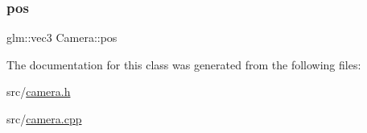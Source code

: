\mbox{\label{classCamera_ae54915cea5c8741a9cc38b8f9b6849ff}} 
\subsubsection{\texorpdfstring{pos}{pos}}
{\footnotesize\ttfamily glm\+::vec3 Camera\+::pos}



The documentation for this class was generated from the following files\+:\begin{DoxyCompactItemize}
\item 
src/\hyperlink{camera_8h}{camera.\+h}\item 
src/\hyperlink{camera_8cpp}{camera.\+cpp}\end{DoxyCompactItemize}
